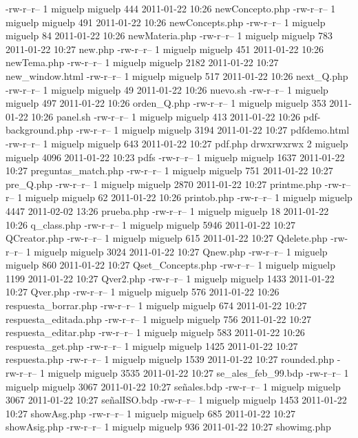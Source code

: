 -rw-r--r--  1 miguelp miguelp      444 2011-01-22 10:26 newConcepto.php
-rw-r--r--  1 miguelp miguelp      491 2011-01-22 10:26 newConcepts.php
-rw-r--r--  1 miguelp miguelp       84 2011-01-22 10:26 newMateria.php
-rw-r--r--  1 miguelp miguelp      783 2011-01-22 10:27 new.php
-rw-r--r--  1 miguelp miguelp      451 2011-01-22 10:26 newTema.php
-rw-r--r--  1 miguelp miguelp     2182 2011-01-22 10:27 new_window.html
-rw-r--r--  1 miguelp miguelp      517 2011-01-22 10:26 next_Q.php
-rw-r--r--  1 miguelp miguelp       49 2011-01-22 10:26 nuevo.sh
-rw-r--r--  1 miguelp miguelp      497 2011-01-22 10:26 orden_Q.php
-rw-r--r--  1 miguelp miguelp      353 2011-01-22 10:26 panel.sh
-rw-r--r--  1 miguelp miguelp      413 2011-01-22 10:26 pdf-background.php
-rw-r--r--  1 miguelp miguelp     3194 2011-01-22 10:27 pdfdemo.html
-rw-r--r--  1 miguelp miguelp      643 2011-01-22 10:27 pdf.php
drwxrwxrwx  2 miguelp miguelp     4096 2011-01-22 10:23 pdfs
-rw-r--r--  1 miguelp miguelp     1637 2011-01-22 10:27 preguntas_match.php
-rw-r--r--  1 miguelp miguelp      751 2011-01-22 10:27 pre_Q.php
-rw-r--r--  1 miguelp miguelp     2870 2011-01-22 10:27 printme.php
-rw-r--r--  1 miguelp miguelp       62 2011-01-22 10:26 printob.php
-rw-r--r--  1 miguelp miguelp     4447 2011-02-02 13:26 prueba.php
-rw-r--r--  1 miguelp miguelp       18 2011-01-22 10:26 q_class.php
-rw-r--r--  1 miguelp miguelp     5946 2011-01-22 10:27 QCreator.php
-rw-r--r--  1 miguelp miguelp      615 2011-01-22 10:27 Qdelete.php
-rw-r--r--  1 miguelp miguelp     3024 2011-01-22 10:27 Qnew.php
-rw-r--r--  1 miguelp miguelp      860 2011-01-22 10:27 Qset_Concepts.php
-rw-r--r--  1 miguelp miguelp     1199 2011-01-22 10:27 Qver2.php
-rw-r--r--  1 miguelp miguelp     1433 2011-01-22 10:27 Qver.php
-rw-r--r--  1 miguelp miguelp      576 2011-01-22 10:26 respuesta_borrar.php
-rw-r--r--  1 miguelp miguelp      674 2011-01-22 10:27 respuesta_editada.php
-rw-r--r--  1 miguelp miguelp      756 2011-01-22 10:27 respuesta_editar.php
-rw-r--r--  1 miguelp miguelp      583 2011-01-22 10:26 respuesta_get.php
-rw-r--r--  1 miguelp miguelp     1425 2011-01-22 10:27 respuesta.php
-rw-r--r--  1 miguelp miguelp     1539 2011-01-22 10:27 rounded.php
-rw-r--r--  1 miguelp miguelp     3535 2011-01-22 10:27 se_ales_feb_99.bdp
-rw-r--r--  1 miguelp miguelp     3067 2011-01-22 10:27 señales.bdp
-rw-r--r--  1 miguelp miguelp     3067 2011-01-22 10:27 señalISO.bdp
-rw-r--r--  1 miguelp miguelp     1453 2011-01-22 10:27 showAsg.php
-rw-r--r--  1 miguelp miguelp      685 2011-01-22 10:27 showAsig.php
-rw-r--r--  1 miguelp miguelp      936 2011-01-22 10:27 showimg.php
